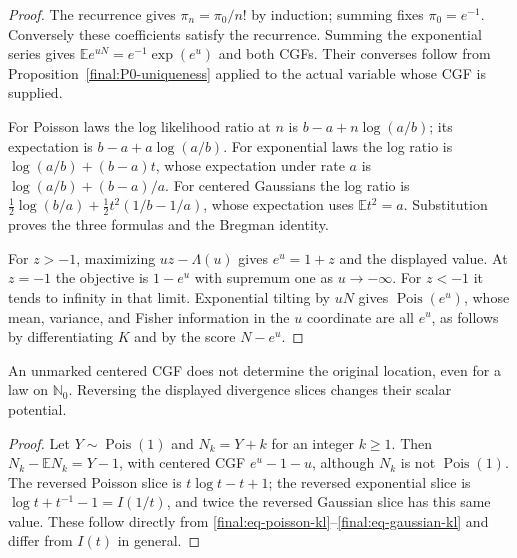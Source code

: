 \begin{proof}
The recurrence gives $\pi_n=\pi_0/n!$ by induction; summing fixes
$\pi_0=e^{-1}$.  Conversely these coefficients satisfy the recurrence.
Summing the exponential series gives
$\mathbb E e^{uN}=e^{-1}\exp(e^u)$ and both CGFs.  Their converses
follow from Proposition~\ref{final:P0-uniqueness} applied to the actual
variable whose CGF is supplied.

For Poisson laws the log likelihood ratio at $n$ is
$b-a+n\log(a/b)$; its expectation is
$b-a+a\log(a/b)$.  For exponential laws the log ratio is
$\log(a/b)+(b-a)t$, whose expectation under rate $a$ is
$\log(a/b)+(b-a)/a$.  For centered Gaussians the log ratio is
$\frac12\log(b/a)+\frac12t^2(1/b-1/a)$, whose expectation uses
$\mathbb E t^2=a$.  Substitution proves the three formulas and the
Bregman identity.

For $z>-1$, maximizing $uz-\Lambda(u)$ gives $e^u=1+z$ and
the displayed value.  At $z=-1$ the objective is $1-e^u$ with
supremum one as $u\to-\infty$.  For $z<-1$ it tends to infinity
in that limit.  Exponential tilting by $uN$ gives
$\operatorname{Pois}(e^u)$, whose mean, variance, and Fisher
information in the $u$ coordinate are all $e^u$, as follows by
differentiating $K$ and by the score $N-e^u$.
\end{proof}

\begin{proposition}
\label{final:P2-boundaries}
An unmarked centered CGF does not determine the original location,
even for a law on $\mathbb N_0$.  Reversing the displayed divergence
slices changes their scalar potential.
\end{proposition}
\begin{proof}
Let $Y\sim\operatorname{Pois}(1)$ and $N_k=Y+k$ for an integer
$k\geq1$.  Then $N_k-\mathbb EN_k=Y-1$, with centered CGF
$e^u-1-u$, although $N_k$ is not $\operatorname{Pois}(1)$.
The reversed Poisson slice is $t\log t-t+1$; the reversed exponential
slice is $\log t+t^{-1}-1=I(1/t)$, and twice the reversed Gaussian
slice has this same value.  These follow directly from
\eqref{final:eq-poisson-kl}--\eqref{final:eq-gaussian-kl} and differ
from $I(t)$ in general.
\end{proof}

